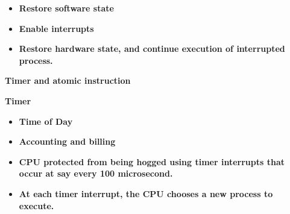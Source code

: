 \documentclass[12pt]{article}
\begin{document}
\begin{itemize}
	\item {\fontsize{16pt}{19.2pt}\selectfont \textbf{Restore software state}\par}\par

	\item {\fontsize{16pt}{19.2pt}\selectfont \textbf{Enable interrupts}\par}\par

	\item {\fontsize{16pt}{19.2pt}\selectfont \textbf{Restore hardware state, and continue execution of interrupted process.}\par}
\end{itemize}\par


\vspace{\baselineskip}
\begin{Center}
{\fontsize{24pt}{28.8pt}\selectfont \textbf{Timer and atomic instruction}\par}
\end{Center}\par

{\fontsize{16pt}{19.2pt}\selectfont \textbf{Timer}\par}\par

\begin{itemize}
	\item {\fontsize{16pt}{19.2pt}\selectfont \textbf{Time of Day}\par}\par

	\item {\fontsize{16pt}{19.2pt}\selectfont \textbf{Accounting and billing}\par}\par

	\item {\fontsize{16pt}{19.2pt}\selectfont \textbf{CPU protected from being hogged using timer interrupts that occur at say every 100 microsecond.}\par}
\end{itemize}\par

\begin{itemize}
	\item {\fontsize{16pt}{19.2pt}\selectfont \textbf{At each timer interrupt, the CPU chooses a new process to execute.}\par}
\end{itemize}\par
\end{document}
